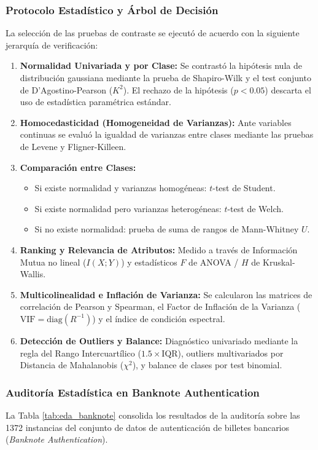 \documentclass{article}
\begin{document}
\subsubsection{Protocolo Estadístico y Árbol de Decisión}
La selección de las pruebas de contraste se ejecutó de acuerdo con la siguiente jerarquía de verificación:
\begin{enumerate}
    \item \textbf{Normalidad Univariada y por Clase:} Se contrastó la hipótesis nula de distribución gaussiana mediante la prueba de Shapiro-Wilk y el test conjunto de D'Agostino-Pearson ($K^2$). El rechazo de la hipótesis ($p < 0.05$) descarta el uso de estadística paramétrica estándar.
    \item \textbf{Homocedasticidad (Homogeneidad de Varianzas):} Ante variables continuas se evaluó la igualdad de varianzas entre clases mediante las pruebas de Levene y Fligner-Killeen.
    \item \textbf{Comparación entre Clases:} 
    \begin{itemize}
        \item Si existe normalidad y varianzas homogéneas: $t$-test de Student.
        \item Si existe normalidad pero varianzas heterogéneas: $t$-test de Welch.
        \item Si no existe normalidad: prueba de suma de rangos de Mann-Whitney $U$.
    \end{itemize}
    \item \textbf{Ranking y Relevancia de Atributos:} Medido a través de Información Mutua no lineal ($I(X; Y)$) y estadísticos $F$ de ANOVA / $H$ de Kruskal-Wallis.
    \item \textbf{Multicolinealidad e Inflación de Varianza:} Se calcularon las matrices de correlación de Pearson y Spearman, el Factor de Inflación de la Varianza ($\text{VIF} = \text{diag}(R^{-1})$) y el índice de condición espectral.
    \item \textbf{Detección de Outliers y Balance:} Diagnóstico univariado mediante la regla del Rango Intercuartílico ($1.5 \times \text{IQR}$), outliers multivariados por Distancia de Mahalanobis ($\chi^2$), y balance de clases por test binomial.
\end{enumerate}

\subsubsection{Auditoría Estadística en Banknote Authentication}
La Tabla \ref{tab:eda_banknote} consolida los resultados de la auditoría sobre las 1372 instancias del conjunto de datos de autenticación de billetes bancarios (\textit{Banknote Authentication}).
\end{document}
